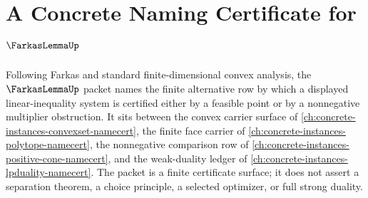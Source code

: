 \chapter{A Concrete Naming Certificate for $\FarkasLemmaUp$}
\label{ch:concrete-instances-farkas-lemma-namecert}

Following Farkas and standard finite-dimensional convex analysis, the $\FarkasLemmaUp$ packet names the finite alternative row by which a displayed linear-inequality system is certified either by a feasible point or by a nonnegative multiplier obstruction. It sits between the convex carrier surface of \autoref{ch:concrete-instances-convexset-namecert}, the finite face carrier of \autoref{ch:concrete-instances-polytope-namecert}, the nonnegative comparison row of \autoref{ch:concrete-instances-positive-cone-namecert}, and the weak-duality ledger of \autoref{ch:concrete-instances-lpduality-namecert}. The packet is a finite certificate surface; it does not assert a separation theorem, a choice principle, a selected optimizer, or full strong duality.


